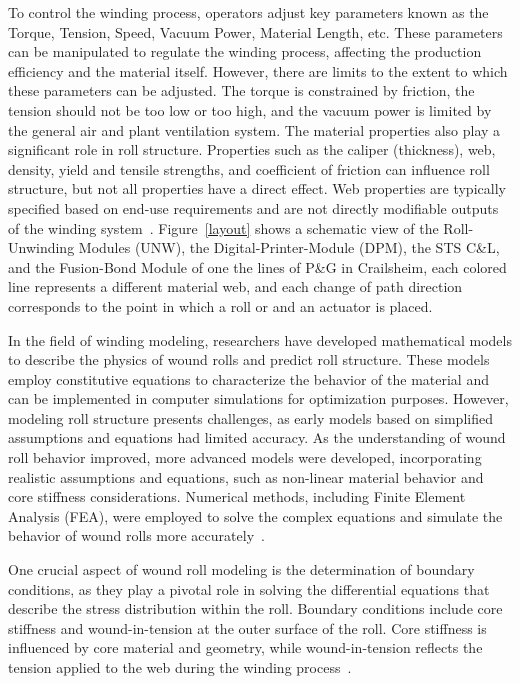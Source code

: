 To control the winding process, operators adjust key parameters known as the Torque, Tension, Speed, Vacuum Power, Material Length, etc. These parameters can be manipulated to regulate the winding process, affecting the production efficiency and the material itself. However, there are limits to the extent to which these parameters can be adjusted. The torque is constrained by friction, the tension should not be too low or too high, and the vacuum power is limited by the general air and plant ventilation system. The material properties also play a significant role in roll structure. Properties such as the caliper (thickness), web, density, yield and tensile strengths, and coefficient of friction can influence roll structure, but not all properties have a direct effect. Web properties are typically specified based on end-use requirements and are not directly modifiable outputs of the winding system~\cite{CriticalWebWrinklingLie2020}. Figure~\ref{layout} shows a schematic view of the Roll-Unwinding Modules (UNW), the Digital-Printer-Module (DPM), the STS C\&L, and the Fusion-Bond Module of one the lines of P\&G in Crailsheim, each colored line represents a different material web, and each change of path direction corresponds to the point in which a roll or and an actuator is placed.

In the field of winding modeling, researchers have developed mathematical models to describe the physics of wound rolls and predict roll structure. These models employ constitutive equations to characterize the behavior of the material and can be implemented in computer simulations for optimization purposes. However, modeling roll structure presents challenges, as early models based on simplified assumptions and equations had limited accuracy. As the understanding of wound roll behavior improved, more advanced models were developed, incorporating realistic assumptions and equations, such as non-linear material behavior and core stiffness considerations. Numerical methods, including Finite Element Analysis (FEA), were employed to solve the complex equations and simulate the behavior of wound rolls more accurately~\cite{Hashimoto2007PredictionMO,rosiumconference}. 

One crucial aspect of wound roll modeling is the determination of boundary conditions, as they play a pivotal role in solving the differential equations that describe the stress distribution within the roll. Boundary conditions include core stiffness and wound-in-tension at the outer surface of the roll. Core stiffness is influenced by core material and geometry, while wound-in-tension reflects the tension applied to the web during the winding process~\cite{walker2009taxonomy}. 


